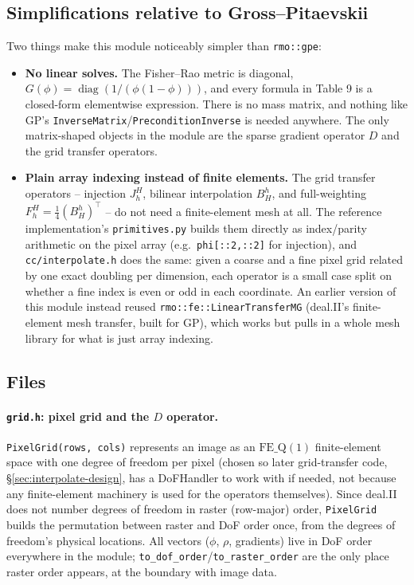 \documentclass[11pt]{article}
\begin{document}
\subsection{Simplifications relative to Gross--Pitaevskii}

Two things make this module noticeably simpler than \texttt{rmo::gpe}:

\begin{itemize}[nosep]
  \item \textbf{No linear solves.} The Fisher--Rao metric is diagonal,
        $G(\phi) = \operatorname{diag}(1/(\phi(1-\phi)))$, and every formula in Table 9 is a
        closed-form elementwise expression. There is no mass matrix, and nothing like GP's
        \texttt{InverseMatrix}/\texttt{PreconditionInverse} is needed anywhere. The only
        matrix-shaped objects in the module are the sparse gradient operator $D$ and the
        grid transfer operators.
  \item \textbf{Plain array indexing instead of finite elements.} The grid transfer
        operators -- injection $J_h^H$, bilinear interpolation $B_H^h$, and full-weighting
        $F_h^H=\tfrac14(B_H^h)^\top$ -- do not need a finite-element mesh at all. The
        reference implementation's \texttt{primitives.py} builds them directly as
        index/parity arithmetic on the pixel array (e.g.\ \texttt{phi[::2,::2]} for
        injection), and \texttt{cc/interpolate.h} does the same: given a coarse and a fine
        pixel grid related by one exact doubling per dimension, each operator is a small
        case split on whether a fine index is even or odd in each coordinate. An earlier
        version of this module instead reused \texttt{rmo::fe::LinearTransferMG}
        (deal.II's finite-element mesh transfer, built for GP), which works but pulls in a
        whole mesh library for what is just array indexing.
\end{itemize}

\subsection{Files}

\paragraph{\texttt{grid.h}: pixel grid and the $D$ operator.} \texttt{PixelGrid(rows, cols)}
represents an image as an $\mathrm{FE\_Q}(1)$ finite-element space with one degree of
freedom per pixel (chosen so later grid-transfer code, \S\ref{sec:interpolate-design}, has a
DoFHandler to work with if needed, not because any finite-element machinery is used for the
operators themselves). Since deal.II does not number degrees of freedom in raster (row-major)
order, \texttt{PixelGrid} builds the permutation between raster and DoF order once, from the
degrees of freedom's physical locations. All vectors ($\phi$, $\rho$, gradients) live in DoF
order everywhere in the module; \texttt{to\_dof\_order}/\texttt{to\_raster\_order} are the
only place raster order appears, at the boundary with image data.
\end{document}
